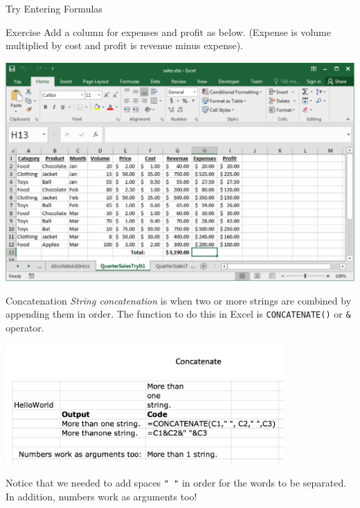\documentclass[xcolor=svgnames]{beamer}
\begin{document}
\begin{frame}{Try Entering Formulas}
  \begin{exampleblock}{Exercise}
 Add a column for expenses and profit as below. (Expense is volume multiplied by cost and profit is revenue minus expense).
  \end{exampleblock}
\begin{center}
 \includegraphics[width=.9\textwidth]{QuarterSalesTryIt.png}
\end{center}
\end{frame}



\begin{frame}[fragile]{Concatenation}
\emph{String concatenation} is when two or more strings are combined by appending them in order.  
The function to do this in Excel is \verb|CONCATENATE()| or \verb|&| operator.
\begin{center}
\hspace*{-9mm}                                                           
 \includegraphics[width=0.8\textwidth]{concatenate}
\end{center}  
Notice that we needed to add spaces \verb|" "| in order for the words to be separated.  In addition, numbers work as arguments too!                                   
\end{frame}
\end{document}
